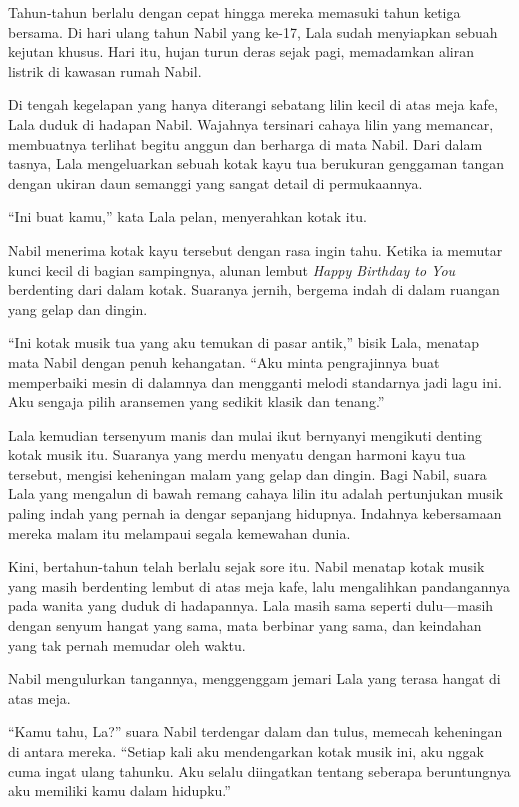 Tahun-tahun berlalu dengan cepat hingga mereka memasuki tahun ketiga bersama. Di hari ulang tahun Nabil yang ke-17, Lala sudah menyiapkan sebuah kejutan khusus. Hari itu, hujan turun deras sejak pagi, memadamkan aliran listrik di kawasan rumah Nabil.

Di tengah kegelapan yang hanya diterangi sebatang lilin kecil di atas meja kafe, Lala duduk di hadapan Nabil. Wajahnya tersinari cahaya lilin yang memancar, membuatnya terlihat begitu anggun dan berharga di mata Nabil. Dari dalam tasnya, Lala mengeluarkan sebuah kotak kayu tua berukuran genggaman tangan dengan ukiran daun semanggi yang sangat detail di permukaannya.

``Ini buat kamu,'' kata Lala pelan, menyerahkan kotak itu.

Nabil menerima kotak kayu tersebut dengan rasa ingin tahu. Ketika ia memutar kunci kecil di bagian sampingnya, alunan lembut \textit{Happy Birthday to You} berdenting dari dalam kotak. Suaranya jernih, bergema indah di dalam ruangan yang gelap dan dingin.

``Ini kotak musik tua yang aku temukan di pasar antik,'' bisik Lala, menatap mata Nabil dengan penuh kehangatan. ``Aku minta pengrajinnya buat memperbaiki mesin di dalamnya dan mengganti melodi standarnya jadi lagu ini. Aku sengaja pilih aransemen yang sedikit klasik dan tenang.''

Lala kemudian tersenyum manis dan mulai ikut bernyanyi mengikuti denting kotak musik itu. Suaranya yang merdu menyatu dengan harmoni kayu tua tersebut, mengisi keheningan malam yang gelap dan dingin. Bagi Nabil, suara Lala yang mengalun di bawah remang cahaya lilin itu adalah pertunjukan musik paling indah yang pernah ia dengar sepanjang hidupnya. Indahnya kebersamaan mereka malam itu melampaui segala kemewahan dunia.

Kini, bertahun-tahun telah berlalu sejak sore itu. Nabil menatap kotak musik yang masih berdenting lembut di atas meja kafe, lalu mengalihkan pandangannya pada wanita yang duduk di hadapannya. Lala masih sama seperti dulu—masih dengan senyum hangat yang sama, mata berbinar yang sama, dan keindahan yang tak pernah memudar oleh waktu.

Nabil mengulurkan tangannya, menggenggam jemari Lala yang terasa hangat di atas meja.

``Kamu tahu, La?'' suara Nabil terdengar dalam dan tulus, memecah keheningan di antara mereka. ``Setiap kali aku mendengarkan kotak musik ini, aku nggak cuma ingat ulang tahunku. Aku selalu diingatkan tentang seberapa beruntungnya aku memiliki kamu dalam hidupku.''

